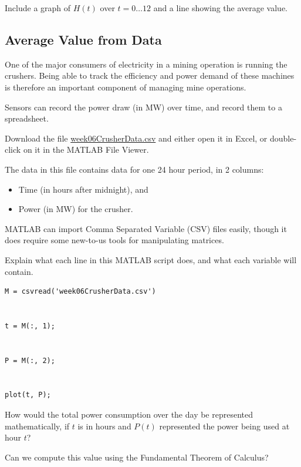Include a graph of $H(t)$ over $t = 0\ldots 12$ and a line showing the
average value.

\newpage

\subsection*{Average Value from Data}

One of the major consumers of electricity in a mining operation is
running the crushers.  Being able to track the efficiency and power
demand of these machines is therefore an important component of
managing mine operations.

Sensors can record the power draw (in MW) over time, and record them
to a spreadsheet.

\problem Download the file
\href{http://www.mast.queensu.ca/~apsc171/MNTCP01/Notes/MATLAB/week06CrusherData.csv}{week06CrusherData.csv}
and either open it in Excel, or double-click on it in the MATLAB File
Viewer.  \vfill

The data in this file contains data for one 24 hour period, in 2 columns:
\begin{itemize}
\item Time (in hours after midnight), and
\item Power (in MW) for the crusher. 
\end{itemize}

\newpage

MATLAB can import Comma Separated Variable (CSV) files easily, though
it does require some new-to-us tools for manipulating matrices.

\problem Explain what each line in this MATLAB script does, and what each variable
will contain.
\begin{verbatim}
M = csvread('week06CrusherData.csv')


t = M(:, 1);


P = M(:, 2);


plot(t, P);
\end{verbatim}

\newpage

\problem How would the total power consumption over the day be
represented mathematically, if $t$ is in hours and $P(t)$ represented
the power being used at hour $t$?

\vfill

Can we compute this value using the Fundamental Theorem of Calculus?

\vfill

